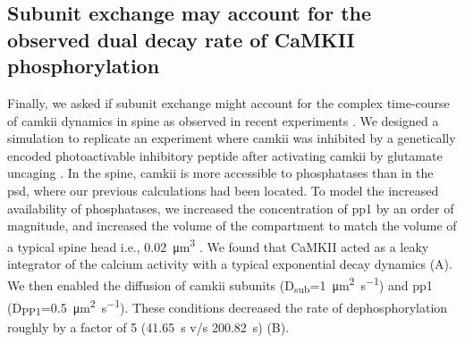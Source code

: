 \documentclass[9pt,lineno,doublespacing]{elife}
\newcommand\SUB[2]{#1\textsubscript{#2}}
\begin{document}
\subsection{Subunit exchange may account for the observed dual decay rate of
    CaMKII phosphorylation}\label{subsec:camkii_decay_two_time_course}

Finally, we asked if subunit exchange might account for the complex time-course
of \gls{camkii} dynamics in spine as observed in recent experiments
\citep{chang_camkii_2017}. We designed a simulation to replicate an experiment
where \gls{camkii} was inhibited by a genetically encoded photoactivable
inhibitory peptide after activating \gls{camkii} by glutamate uncaging
\citep{murakoshi_kinetics_2017}. In the spine, \gls{camkii} is more accessible
to phosphatases than in the \gls{psd}, where our previous calculations had been
located. To model the increased availability of phosphatases, we increased the
concentration of \gls{pp1} by an order of magnitude, and increased the volume of
the compartment to match the volume of a typical spine head i.e.,
\SI{0.02}{\cubic\micro\meter} \citep{bartol_nanoconnectomic_2015}. We found that
CaMKII acted as a leaky integrator of the calcium activity with a typical
exponential decay dynamics (A). We then enabled the
diffusion of \gls{camkii} subunits
(\SUB{D}{sub}=\SI{1}{\micro\meter\squared\per\second}) and \gls{pp1}
(\SUB{D}{PP1}=\SI{0.5}{\micro\meter\squared\per\second}). These conditions
decreased the rate of dephosphorylation roughly by a factor of 5
(\SI{41.65}{\second} v/s \SI{200.82}{\second}) (B). 
\end{document}
